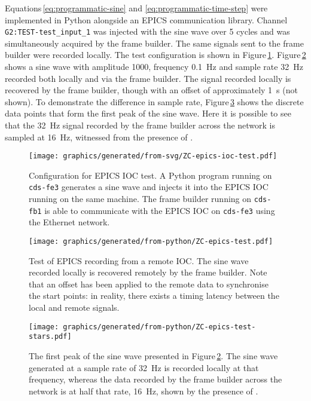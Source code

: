 Equations\,\ref{eq:programmatic-sine} and \ref{eq:programmatic-time-step} were implemented in Python alongside an \gls{EPICS} communication library. Channel \lstinline!G2:TEST-test_input_1! was injected with the sine wave over \num{5} cycles and was simultaneously acquired by the frame builder. The same signals sent to the frame builder were recorded locally. The test configuration is shown in Figure\,\ref{fig:epics-ioc-test}. Figure\,\ref{fig:epics-test} shows a sine wave with amplitude \num{1000}, frequency \SI{0.1}{\hertz} and sample rate \SI{32}{\hertz} recorded both locally and via the frame builder. The signal recorded locally is recovered by the frame builder, though with an offset of approximately \SI{1}{\second} (not shown). To demonstrate the difference in sample rate, Figure\,\ref{fig:epics-test-stars} shows the discrete data points that form the first peak of the sine wave. Here it is possible to see that the \SI{32}{\hertz} signal recorded by the frame builder across the network is sampled at \SI{16}{\hertz}, witnessed from the presence of .

\begin{figure}
  \centering
  \texttt{[image: graphics/generated/from-svg/ZC-epics-ioc-test.pdf]}
  \caption[Configuration for input/output controller test]{\label{fig:epics-ioc-test}Configuration for EPICS IOC test. A Python program running on \lstinline!cds-fe3! generates a sine wave and injects it into the EPICS IOC running on the same machine. The frame builder running on \lstinline!cds-fb1! is able to communicate with the EPICS IOC on \lstinline!cds-fe3! using the Ethernet network.}
\end{figure}

\begin{figure}
  \centering
  \texttt{[image: graphics/generated/from-python/ZC-epics-test.pdf]}
  \caption[Recording a remote input/output controller with the frame builder]{\label{fig:epics-test}Test of EPICS recording from a remote IOC. The sine wave recorded locally is recovered remotely by the frame builder. Note that an offset has been applied to the remote data to synchronise the start points: in reality, there exists a timing latency between the local and remote signals.}
\end{figure}

\begin{figure}
  \centering
  \texttt{[image: graphics/generated/from-python/ZC-epics-test-stars.pdf]}
  \caption[Effects of the sample rate on signal reconstruction from the input/output controller]{\label{fig:epics-test-stars}The first peak of the sine wave presented in Figure\,\ref{fig:epics-test}. The sine wave generated at a sample rate of \SI{32}{\hertz} is recorded locally at that frequency, whereas the data recorded by the frame builder across the network is at half that rate, \SI{16}{\hertz}, shown by the presence of .}
\end{figure}

